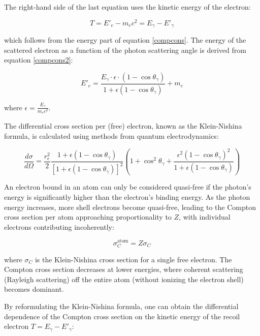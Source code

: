 The right-hand side of the last equation uses the kinetic energy of the electron:

\begin{equation}
T = E'_e - m_e c^2 = E_\gamma - E'_\gamma
\end{equation}

which follows from the energy part of equation \ref{compcons}. 
The energy of the scattered electron as a function of the photon scattering 
angle is derived from equation \ref{compcons2}:

\begin{equation}\label{diffeq}
E'_e = \frac{E_\gamma \cdot \epsilon \cdot (1 - \cos \theta_\gamma)}{1 + \epsilon (1 - \cos \theta_\gamma)}+m_e
\end{equation}

where $\epsilon = \frac{E_\gamma}{m_e c^2}$.

The differential cross section per (free) electron, known as the 
Klein-Nishina formula, is calculated using methods from quantum electrodynamics:

\begin{equation}\label{kleinnishina}
\frac{d\sigma}{d\Omega} = \frac{r_e^2}{2} \frac{1 + \epsilon (1 - \cos \theta_\gamma)}{[1 + \epsilon (1 - \cos \theta_\gamma)]^2} \left(1 + \cos^2 \theta_\gamma + \frac{\epsilon^2 (1 - \cos \theta_\gamma)^2}{1 + \epsilon (1 - \cos \theta_\gamma)} \right)
\end{equation}

An electron bound in an atom can only be considered quasi-free 
if the photon's energy is significantly higher than the electron's 
binding energy. As the photon energy increases, more shell electrons 
become quasi-free, leading to the Compton cross section per atom 
approaching proportionality to $Z$, with individual electrons 
contributing incoherently:

\begin{equation}
\sigma_C^{\text{atom}} = Z\sigma_C
\end{equation}

where $\sigma_C$ is the Klein-Nishina cross section for a 
single free electron. The Compton cross section decreases at 
lower energies, where coherent scattering (Rayleigh scattering) 
off the entire atom (without ionizing the electron shell) becomes dominant.

By reformulating the Klein-Nishina formula, one can obtain the 
differential dependence of the Compton cross section on the 
kinetic energy of the recoil electron $T = E_\gamma - E'_\gamma$:

